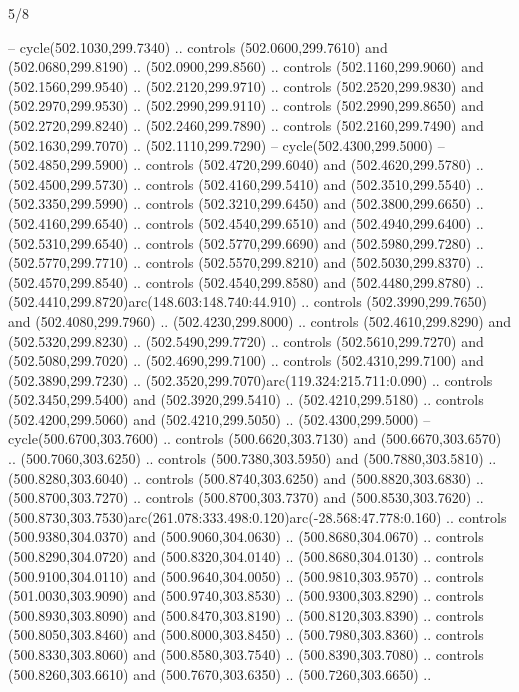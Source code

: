\begin{flagdescription}{5/8}
\begin{scope}[xshift=0.5\flaglength,yshift=0.5\flagwidth,scale=\flagwidth/475.63]
\begin{scope}[y=0.8pt, x=0.8pt, yscale=-1, xscale=1,shift={(-450,-300)}]
\begin{scope}[cm={{1.0,0.0,0.0,1.0,(-0.0002,0.12556)}},cm={{1.0,0.0,0.0,1.0,(0.00179,0.0)}}]
\begin{scope}[cm={{1.11592,0.0,0.0,1.11592,(-106.89933,-41.77764)}}]
\begin{scope}[draw=black,fill=cfff]
\begin{scope}[fill=black]
  -- cycle(502.1030,299.7340) .. controls (502.0600,299.7610) and
  (502.0680,299.8190) .. (502.0900,299.8560) .. controls (502.1160,299.9060) and
  (502.1560,299.9540) .. (502.2120,299.9710) .. controls (502.2520,299.9830) and
  (502.2970,299.9530) .. (502.2990,299.9110) .. controls (502.2990,299.8650) and
  (502.2720,299.8240) .. (502.2460,299.7890) .. controls (502.2160,299.7490) and
  (502.1630,299.7070) .. (502.1110,299.7290) -- cycle(502.4300,299.5000) --
  (502.4850,299.5900) .. controls (502.4720,299.6040) and (502.4620,299.5780) ..
  (502.4500,299.5730) .. controls (502.4160,299.5410) and (502.3510,299.5540) ..
  (502.3350,299.5990) .. controls (502.3210,299.6450) and (502.3800,299.6650) ..
  (502.4160,299.6540) .. controls (502.4540,299.6510) and (502.4940,299.6400) ..
  (502.5310,299.6540) .. controls (502.5770,299.6690) and (502.5980,299.7280) ..
  (502.5770,299.7710) .. controls (502.5570,299.8210) and (502.5030,299.8370) ..
  (502.4570,299.8540) .. controls (502.4540,299.8580) and (502.4480,299.8780) ..
  (502.4410,299.8720)arc(148.603:148.740:44.910) .. controls (502.3990,299.7650)
  and (502.4080,299.7960) .. (502.4230,299.8000) .. controls (502.4610,299.8290)
  and (502.5320,299.8230) .. (502.5490,299.7720) .. controls (502.5610,299.7270)
  and (502.5080,299.7020) .. (502.4690,299.7100) .. controls (502.4310,299.7100)
  and (502.3890,299.7230) .. (502.3520,299.7070)arc(119.324:215.711:0.090) ..
  controls (502.3450,299.5400) and (502.3920,299.5410) .. (502.4210,299.5180) ..
  controls (502.4200,299.5060) and (502.4210,299.5050) .. (502.4300,299.5000) --
  cycle(500.6700,303.7600) .. controls (500.6620,303.7130) and
  (500.6670,303.6570) .. (500.7060,303.6250) .. controls (500.7380,303.5950) and
  (500.7880,303.5810) .. (500.8280,303.6040) .. controls (500.8740,303.6250) and
  (500.8820,303.6830) .. (500.8700,303.7270) .. controls (500.8700,303.7370) and
  (500.8530,303.7620) ..
  (500.8730,303.7530)arc(261.078:333.498:0.120)arc(-28.568:47.778:0.160) ..
  controls (500.9380,304.0370) and (500.9060,304.0630) .. (500.8680,304.0670) ..
  controls (500.8290,304.0720) and (500.8320,304.0140) .. (500.8680,304.0130) ..
  controls (500.9100,304.0110) and (500.9640,304.0050) .. (500.9810,303.9570) ..
  controls (501.0030,303.9090) and (500.9740,303.8530) .. (500.9300,303.8290) ..
  controls (500.8930,303.8090) and (500.8470,303.8190) .. (500.8120,303.8390) ..
  controls (500.8050,303.8460) and (500.8000,303.8450) .. (500.7980,303.8360) ..
  controls (500.8330,303.8060) and (500.8580,303.7540) .. (500.8390,303.7080) ..
  controls (500.8260,303.6610) and (500.7670,303.6350) .. (500.7260,303.6650) ..

\end{scope}
\end{scope}
\end{scope}
\end{scope}
\end{scope}
\end{scope}
\end{flagdescription}
